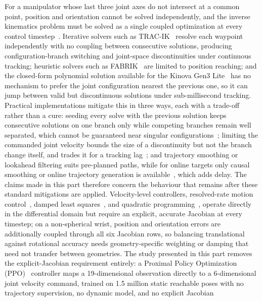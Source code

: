 For a manipulator whose last three joint axes do not intersect at a common point, position and
orientation cannot be solved independently, and the inverse kinematics problem must be solved as a
single coupled optimization at every control timestep~\citep{sk2025diktracking}. Iterative solvers
such as TRAC-IK~\citep{beeson2015trac} resolve each waypoint independently with no coupling between
consecutive solutions, producing configuration-branch switching and joint-space discontinuities
under continuous tracking; heuristic solvers such as FABRIK~\citep{aristidou2011fabrik} are limited
to position reaching; and the closed-form polynomial solution available for the Kinova Gen3
Lite~\citep{zohour2021kinova} has no mechanism to prefer the joint configuration nearest the
previous one, so it can jump between valid but discontinuous solutions under sub-millisecond
tracking. Practical implementations mitigate this in three ways, each with a trade-off rather than a
cure: seeding every solve with the previous solution keeps consecutive solutions on one branch only
while competing branches remain well separated, which cannot be guaranteed near singular
configurations~\citep{beeson2015trac,dai2019global}; limiting the commanded joint velocity bounds the
size of a discontinuity but not the branch change itself, and trades it for a tracking
lag~\citep{faroni2018predictive}; and trajectory smoothing or lookahead filtering suits pre-planned
paths, while for online targets only causal smoothing or online trajectory generation is
available~\citep{kroger2010line,macfarlane2003jerk}, which adds delay. The claims made in this part
therefore concern the behaviour that remains after these standard mitigations are applied.
Velocity-level controllers, resolved-rate motion control~\citep{whitney1969resolved}, damped least
squares~\citep{wampler1986manipulator,chiaverini1994review}, and quadratic
programming~\citep{zhang2013variable}, operate directly in the differential domain but require an
explicit, accurate Jacobian at every timestep; on a non-spherical wrist, position and orientation
errors are additionally coupled through all six Jacobian rows, so balancing translational against
rotational accuracy needs geometry-specific weighting or damping that need not transfer between
geometries. The study presented in this part removes the explicit-Jacobian requirement entirely: a
Proximal Policy Optimization (PPO)~\citep{schulman2017proximal} controller maps a 19-dimensional
observation directly to a 6-dimensional joint velocity command, trained on 1.5 million static
reachable poses with no trajectory supervision, no dynamic model, and no explicit Jacobian
